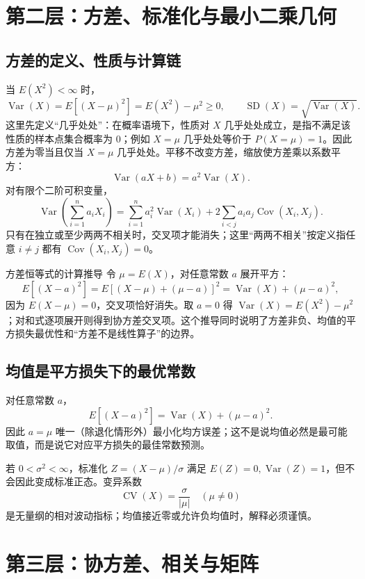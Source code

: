 \documentclass[11pt,a4paper]{ctexart}
\begin{document}
\section{第二层：方差、标准化与最小二乘几何}

\subsection{方差的定义、性质与计算链}

当 $E(X^2)<\infty$ 时，
\[
\operatorname{Var}(X)=E[(X-\mu)^2]=E(X^2)-\mu^2\geq0,\qquad \operatorname{SD}(X)=\sqrt{\operatorname{Var}(X)}.
\]
这里先定义“几乎处处”：在概率语境下，性质对 $X$ 几乎处处成立，是指不满足该性质的样本点集合概率为 $0$；例如 $X=\mu$ 几乎处处等价于 $P(X=\mu)=1$。因此方差为零当且仅当 $X=\mu$ 几乎处处。平移不改变方差，缩放使方差乘以系数平方：
\[
\operatorname{Var}(aX+b)=a^2\operatorname{Var}(X).
\]
对有限个二阶可积变量，
\[
\operatorname{Var}\left(\sum_{i=1}^na_iX_i\right)
=\sum_{i=1}^na_i^2\operatorname{Var}(X_i)
+2\sum_{i<j}a_ia_j\operatorname{Cov}(X_i,X_j).
\]
只有在独立或至少两两不相关时，交叉项才能消失；这里“两两不相关”按定义指任意 $i\ne j$ 都有 $\operatorname{Cov}(X_i,X_j)=0$。

\begin{methodbox}{方差恒等式的计算推导}
令 $\mu=E(X)$，对任意常数 $a$ 展开平方：
\[
E[(X-a)^2]
=E[(X-\mu)+(\mu-a)]^2
=\operatorname{Var}(X)+(\mu-a)^2,
\]
因为 $E(X-\mu)=0$，交叉项恰好消失。取 $a=0$ 得
$\operatorname{Var}(X)=E(X^2)-\mu^2$；对和式逐项展开则得到协方差交叉项。这个推导同时说明了方差非负、均值的平方损失最优性和“方差不是线性算子”的边界。
\end{methodbox}

\subsection{均值是平方损失下的最优常数}

对任意常数 $a$，
\[
\boxed{E[(X-a)^2]=\operatorname{Var}(X)+(\mu-a)^2}.
\]
因此 $a=\mu$ 唯一（除退化情形外）最小化均方误差；这不是说均值必然是最可能取值，而是说它对应平方损失的最佳常数预测。

若 $0<\sigma^2<\infty$，标准化 $Z=(X-\mu)/\sigma$ 满足 $E(Z)=0,\operatorname{Var}(Z)=1$，但不会因此变成标准正态。变异系数
\[
\operatorname{CV}(X)=\frac{\sigma}{\lvert\mu\rvert}\quad(\mu\neq0)
\]
是无量纲的相对波动指标；均值接近零或允许负均值时，解释必须谨慎。

\section{第三层：协方差、相关与矩阵}
\end{document}
